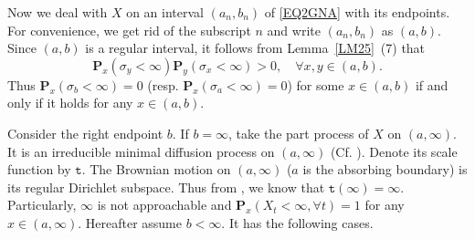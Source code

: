 \documentclass[a4paper]{amsart}
\theoremstyle{definition}
\theoremstyle{remark}
\numberwithin{equation}{section}
\begin{document}
Now we deal with $X$ on an interval $(a_n,b_n)$ of \eqref{EQ2GNA} with its endpoints. For convenience, we get rid of the subscript $n$ and write $(a_n,b_n)$ as $(a,b)$. Since $(a,b)$ is a regular interval, it follows from Lemma~\ref{LM25}~(7) that
\[
	\mathbf{P}_x(\sigma_y<\infty)\mathbf{P}_y(\sigma_x<\infty)>0,\quad \forall x,y\in (a,b).
\]
Thus $\mathbf{P}_x(\sigma_b<\infty)=0$ (resp. $\mathbf{P}_x(\sigma_a<\infty)=0$) for some $x\in (a,b)$ if and only if it holds for any $x\in (a,b)$.

Consider the right endpoint $b$. If $b=\infty$, take the part process of $X$ on $(a,\infty)$. It is an irreducible minimal diffusion process on $(a,\infty)$ (Cf. \cite[Example~3.5.7]{CF12}). Denote its scale function by ${{\mathtt{t}}}$. The Brownian motion on $(a,\infty)$ ($a$ is the absorbing boundary) is its regular Dirichlet subspace. Thus from \cite[Theorem~4.1]{FHY10}, we know that ${{\mathtt{t}}}(\infty)=\infty$. Particularly, $\infty$ is not approachable and $\mathbf{P}_x(X_t<\infty, \forall t)=1$ for any $x\in (a,\infty)$. Hereafter assume $b<\infty$. It has the following cases.
\end{document}
